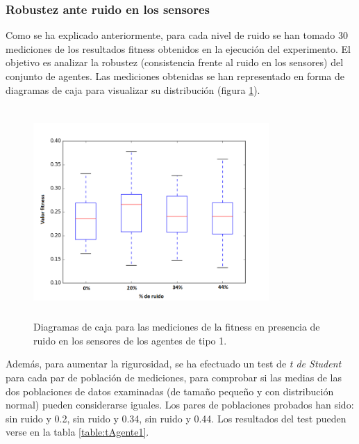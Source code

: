\subsubsection{Robustez ante ruido en los sensores}
Como se ha explicado anteriormente, para cada nivel de ruido se han tomado 30 mediciones de los resultados fitness obtenidos en la ejecución del experimento. El objetivo es analizar la robustez (consistencia frente al ruido en los sensores) del conjunto de agentes. Las mediciones obtenidas se han representado en forma de diagramas de caja para visualizar su distribución (figura \ref{fig:boxPlot1}).

\begin{figure}[H]
    \centering
    \includegraphics[width=0.8\textwidth,height=8cm]{Imagenes/BoxPlot1}
    \caption{Diagramas de caja para las mediciones de la fitness en presencia de ruido en los sensores de los agentes de tipo 1.}
    \label{fig:boxPlot1}
\end{figure}

Además, para aumentar la rigurosidad, se ha efectuado un test de \textit{t de Student} para cada par de población de mediciones, para comprobar si las medias de las dos poblaciones de datos examinadas (de tamaño pequeño y con distribución normal) pueden considerarse iguales. Los pares de poblaciones probados han sido: sin ruido y 0.2, sin ruido y 0.34, sin ruido y 0.44. Los resultados del test pueden verse en la tabla \ref{table:tAgente1}.

